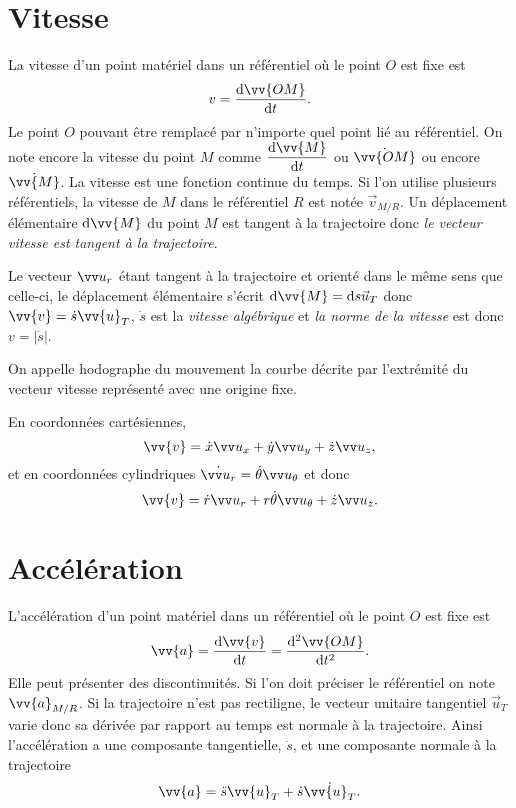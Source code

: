 \section{Vitesse}%
\label{chap1-sec:vitesse}%

La vitesse d'un point matériel dans un référentiel où le point \(O\) est fixe 
est
\begin{equation}%
  v = \derived{\vv{OM}}{t}.
\end{equation}%
Le point \(O\) pouvant être remplacé par n'importe quel point lié au 
référentiel. On note encore la vitesse du point \(M\) comme 
\(\derived{\vv{M}}{t}\) ou \(\dot{\vv{OM}}\) ou encore \(\dot{\vv{M}}\). La 
vitesse est une fonction continue du temps. Si l'on utilise plusieurs 
référentiels, la vitesse de \(M\) dans le référentiel \(R\) est notée 
\(\vec{v}_{M/R}\). Un déplacement élémentaire \(\D \vv{M}\) du point \(M\) est 
tangent à la trajectoire donc \emph{le vecteur vitesse est tangent à la 
trajectoire}.

Le vecteur \(\ur\) étant tangent à la trajectoire et orienté dans le même sens 
que celle-ci, le déplacement élémentaire s'écrit \(\D \vv{M}=\D s \vec{u}_T\) 
donc \(\vv{v}=\dot{s} \vv{u}_T\), \(\dot{s}\) est la \emph{vitesse algébrique} 
et \emph{la norme de la vitesse} est donc \(v=|\dot{s}|\).

On appelle hodographe du mouvement la courbe décrite par l'extrémité du vecteur 
vitesse représenté avec une origine fixe.

En coordonnées cartésiennes,
\begin{equation}%
  \vv{v} = \dot{x}\ux+\dot{y}\uy+\dot{z}\uz,%
\end{equation}%
et en coordonnées cylindriques \(\dot{\ur}=\dot{\theta}\utheta\) et donc
\begin{equation}%
  \vv{v}=\dot{r}\ur+r\dot{\theta}\utheta+\dot{z}\uz.%
\end{equation}%

\section{Accélération}%
\label{chap1-sec:accélération}%

L'accélération d'un point matériel dans un référentiel où le point \(O\) est 
fixe est
\begin{equation}%
  \vv{a}=\derived{\vv{v}}{t}=\deriveds{\vv{OM}}{t}.%
\end{equation}%
Elle peut présenter des discontinuités. Si l'on doit préciser le référentiel on 
note \(\vv{a}_{M/R}\). Si la trajectoire n'est pas rectiligne, le vecteur 
unitaire tangentiel \(\vec{u}_T\) varie donc sa dérivée par rapport au temps 
est normale à la trajectoire. Ainsi l'accélération a une composante 
tangentielle, \(\ddot{s}\), et une composante normale à la trajectoire
\begin{equation}%
  \vv{a}=\ddot{s}\vv{u}_T + \dot{s}\dot{\vv{u}_T}.%
\end{equation}%


